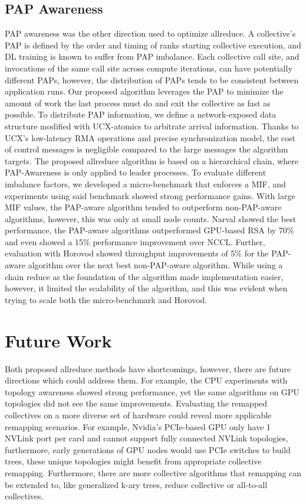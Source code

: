 \subsection{PAP Awareness}
\gls{PAP} awareness was the other direction used to optimize allreduce.
A collective's \gls{PAP} is defined by the order and timing of ranks starting collective execution, and \gls{DL} training is known to suffer from \gls{PAP} imbalance.
Each collective call site, and invocations of the same call site across compute iterations, can have potentially different \gls{PAP}s, however, the distribution of \gls{PAP}s tends to be consistent between application runs.
Our proposed algorithm leverages the \gls{PAP} to minimize the amount of work the last process must do and exit the collective as fast as possible.
To distribute \gls{PAP} information, we define a network-exposed data structure modified with \gls{UCX}-atomics to arbitrate arrival information.
Thanks to \gls{UCX}'s low-latency \gls{RMA} operations and precise synchronization model, the cost of control messages is negligible compared to the large messages the algorithm targets.
The proposed allreduce algorithm is based on a hierarchical chain, where \gls{PAP}-Awareness is only applied to leader processes.
To evaluate different imbalance factors, we developed a micro-benchmark that enforces a \gls{MIF}, and experiments using said benchmark showed strong performance gains.
With large \gls{MIF} values, the \gls{PAP}-aware algorithm tended to outperform non-\gls{PAP}-aware algorithms, however, this was only at small node counts.
Narval showed the best performance, the \gls{PAP}-aware algorithms outperformed \gls{GPU}-based \gls{RSA} by 70\% and even showed a 15\% performance improvement over \gls{NCCL}.
Further, evaluation with Horovod showed throughput improvements of 5\% for the \gls{PAP}-aware algorithm over the next best non-\gls{PAP}-aware algorithm.
While using a chain reduce as the foundation of the algorithm made implementation easier, however, it limited the scalability of the algorithm, and this was evident when trying to scale both the micro-benchmark and Horovod.

\section{Future Work}
Both proposed allreduce methods have shortcomings, however, there are future directions which could address them.
For example, the \gls{CPU} experiments with topology awareness showed strong performance, yet the same algorithms on \gls{GPU} topologies did not see the same improvements.
Evaluating the remapped collectives on a more diverse set of hardware could reveal more applicable remapping scenarios.
For example, Nvidia's \gls{PCIe}-based \gls{GPU} only have 1 NVLink port per card and cannot support fully connected NVLink topologies, furthermore, early generations of \gls{GPU} nodes would use \gls{PCIe} switches to build trees, these unique topologies might benefit from appropriate collective remapping.
Furthermore, there are more collective algorithms that remapping can be extended to, like generalized k-ary trees, reduce collective or all-to-all collectives.

